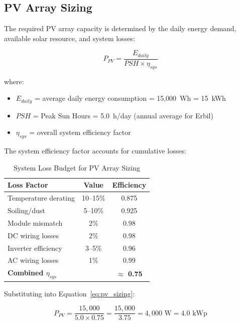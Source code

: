\subsection{PV Array Sizing}

The required PV array capacity is determined by the daily energy demand, available solar resource, and system losses:

\begin{equation}
    P_{PV} = \frac{E_{daily}}{PSH \times \eta_{sys}}
    \label{eq:pv_sizing}
\end{equation}

\noindent where:
\begin{itemize}
    \item $E_{daily}$ = average daily energy consumption = 15,000~Wh = 15~kWh
    \item $PSH$ = Peak Sun Hours = 5.0~h/day (annual average for Erbil)
    \item $\eta_{sys}$ = overall system efficiency factor
\end{itemize}

The system efficiency factor accounts for cumulative losses:

\begin{table}[H]
\centering
\caption{System Loss Budget for PV Array Sizing}
\label{tab:losses}
\begin{tabular}{@{}p{5.5cm} c c@{}}
\toprule
\textbf{Loss Factor} & \textbf{Value} & \textbf{Efficiency} \\
\midrule
Temperature derating & 10--15\% & 0.875 \\
Soiling/dust & 5--10\% & 0.925 \\
Module mismatch & 2\% & 0.98 \\
DC wiring losses & 2\% & 0.98 \\
Inverter efficiency & 3--5\% & 0.96 \\
AC wiring losses & 1\% & 0.99 \\
\midrule
\textbf{Combined $\eta_{sys}$} & & \textbf{$\approx$ 0.75} \\
\bottomrule
\end{tabular}
\end{table}

Substituting into Equation~\ref{eq:pv_sizing}:

\begin{equation}
    P_{PV} = \frac{15{,}000}{5.0 \times 0.75} = \frac{15{,}000}{3.75} = 4{,}000 \text{~W} = 4.0 \text{~kWp}
    \label{eq:pv_result}
\end{equation}

